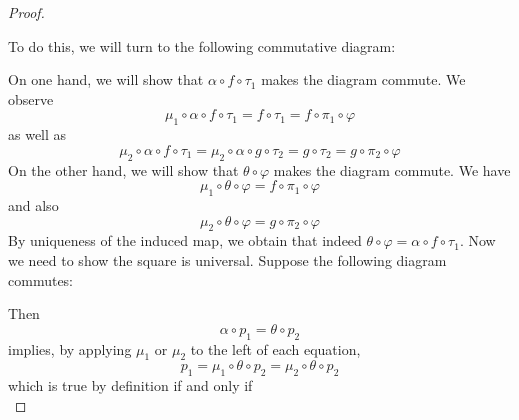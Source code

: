 \documentclass{article}
\begin{document}
\begin{proof}
\begin{center}
    \end{center}
    To do this, we will turn to the following commutative diagram:
    \begin{center}
    \end{center}
    On one hand, we will show that $\alpha\circ f\circ \tau_1$ makes the diagram commute. We observe
    \[
    \mu_1\circ \alpha\circ f\circ \tau_1=f\circ \tau_1=f\circ \pi_1\circ \varphi
    \]
    as well as
    \[
    \mu_2\circ \alpha \circ f \circ \tau_1=\mu_2\circ \alpha\circ g\circ \tau_2=g\circ \tau_2=g\circ \pi_2\circ \varphi
    \]
    On the other hand, we will show that $\theta\circ \varphi$ makes the diagram commute. We have
    \[
    \mu_1\circ \theta\circ \varphi=f\circ \pi_1\circ \varphi
    \]
    and also
    \[
    \mu_2\circ \theta \circ \varphi=g\circ \pi_2\circ \varphi
    \]
    By uniqueness of the induced map, we obtain that indeed $\theta\circ \varphi=\alpha \circ f\circ \tau_1$. Now we need to show the square is universal. Suppose the following diagram commutes:
    \begin{center}
    \end{center}
    Then 
    \[
    \alpha\circ p_1=\theta\circ p_2  
    \]
    implies, by applying $\mu_1$ or $\mu_2$ to the left of each equation,
    \[
    p_1=\mu_1\circ \theta \circ p_2=\mu_2\circ \theta \circ p_2
    \]
    which is true by definition if and only if
    \[
\]
\end{proof}
\end{document}
